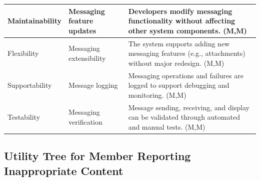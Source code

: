 \documentclass{article}
\begin{document}
\begin{table}[H]
\begin{tabular}{|p{3cm}|p{4cm}|p{7cm}|}
Maintainability
& Messaging feature updates
& Developers modify messaging functionality without affecting other system components. (M,M) \\
\hline

Flexibility
& Messaging extensibility
& The system supports adding new messaging features (e.g., attachments) without major redesign. (M,M) \\
\hline

Supportability
& Message logging
& Messaging operations and failures are logged to support debugging and monitoring. (M,M) \\
\hline

Testability
& Messaging verification
& Message sending, receiving, and display can be validated through automated and manual tests. (M,M) \\
\hline

\end{tabular}
\end{table}

\subsection{Utility Tree for Member Reporting Inappropriate Content}
\end{document}
